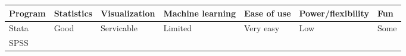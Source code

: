 \documentclass[]{book}
\begin{document}
\begin{longtable}[]{@{}lllllll@{}}
\toprule
\begin{minipage}[b]{0.08\columnwidth}\raggedright
Program\strut
\end{minipage} & \begin{minipage}[b]{0.10\columnwidth}\raggedright
Statistics\strut
\end{minipage} & \begin{minipage}[b]{0.13\columnwidth}\raggedright
Visualization\strut
\end{minipage} & \begin{minipage}[b]{0.16\columnwidth}\raggedright
Machine learning\strut
\end{minipage} & \begin{minipage}[b]{0.11\columnwidth}\raggedright
Ease of use\strut
\end{minipage} & \begin{minipage}[b]{0.17\columnwidth}\raggedright
Power/flexibility\strut
\end{minipage} & \begin{minipage}[b]{0.05\columnwidth}\raggedright
Fun\strut
\end{minipage}\tabularnewline
\midrule
\endhead
\begin{minipage}[t]{0.08\columnwidth}\raggedright
Stata\strut
\end{minipage} & \begin{minipage}[t]{0.10\columnwidth}\raggedright
Good\strut
\end{minipage} & \begin{minipage}[t]{0.13\columnwidth}\raggedright
Servicable\strut
\end{minipage} & \begin{minipage}[t]{0.16\columnwidth}\raggedright
Limited\strut
\end{minipage} & \begin{minipage}[t]{0.11\columnwidth}\raggedright
Very easy\strut
\end{minipage} & \begin{minipage}[t]{0.17\columnwidth}\raggedright
Low\strut
\end{minipage} & \begin{minipage}[t]{0.05\columnwidth}\raggedright
Some\strut
\end{minipage}\tabularnewline
\begin{minipage}[t]{0.08\columnwidth}\raggedright
SPSS\strut
\end{minipage} & \begin{minipage}[t]{0.10\columnwidth}\raggedright

\end{minipage}
\end{longtable}
\end{document}
